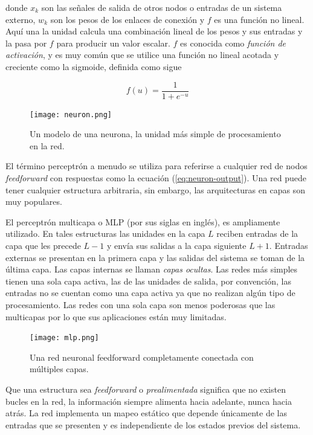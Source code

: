 donde $x_k$ son las señales de salida de otros nodos o entradas de un sistema
externo, $w_k$ son los pesos de los enlaces de conexión y $f$ es una función
no lineal. Aquí una la unidad calcula una combinación lineal de los pesos y sus
entradas y la pasa por $f$ para producir un valor escalar. 
$f$ es conocida como \textit{función de activación}, y es muy común que
se utilice una función no lineal acotada y creciente como la sigmoide, definida como sigue

\[
f(u) = \frac{1}{1 + e^{-u}}
\]

\begin{figure}
    \centering
    \texttt{[image: neuron.png]}
    \caption{Un modelo de una neurona, la unidad más simple de procesamiento en la red.}
    \label{fig:neuron}
\end{figure}
El término perceptrón a menudo se utiliza para referirse a cualquier
red de nodos \textit{feedforward} con respuestas como la ecuación (\ref{eq:neuron-output}).
Una red puede tener cualquier estructura arbitraria, sin embargo, 
las arquitecturas en capas son muy populares.\\

\begin{remark}
El perceptrón
multicapa o MLP (por sus siglas en inglés), es ampliamente utilizado.
En tales estructuras las unidades en la capa $L$ reciben entradas de la capa
que les precede $L-1$ y envía sus salidas a la capa siguiente $L+1$. Entradas
externas se presentan en la primera capa y las salidas del sistema se toman
de la última capa. Las capas internas se llaman \textit{capas ocultas}. Las redes
más simples tienen una sola capa activa, las de las unidades de salida, por convención, las entradas no se cuentan como una capa activa ya que no realizan
algún tipo de procesamiento. Las redes con una sola capa son menos 
poderosas que las multicapas por lo que sus aplicaciones están
muy limitadas.
\end{remark}

\begin{figure}
    \centering
    \texttt{[image: mlp.png]}
    \caption{Una red neuronal feedforward completamente conectada con múltiples capas.}
    \label{fig:mpl}
\end{figure}

Que una estructura sea \textit{feedforward} o \textit{prealimentada} significa 
que no existen bucles en la red, la información siempre alimenta
hacia adelante, nunca hacia atrás. La red implementa un
mapeo estático que depende únicamente de las entradas que se presenten y es 
independiente de los estados previos del sistema.\\

